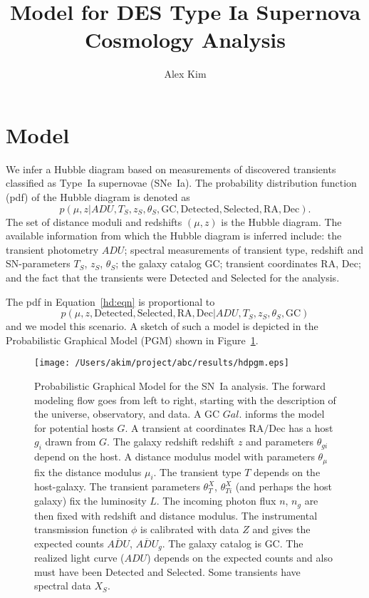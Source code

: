 \documentclass[preprint]{aastex}
\begin{document}
\title{Model for DES Type Ia Supernova Cosmology Analysis}
\author{Alex Kim}

\section{Model}
We infer a Hubble diagram based on measurements of discovered transients
classified as Type~Ia supernovae (SNe~Ia).  The probability distribution
function (pdf) of the Hubble diagram is denoted as
\begin{equation}
p({\mu},{z} |  {{ADU}}, {{T}}_S,{{z}}_S,
{{\theta}}_S,\text{GC}, \text{Detected}, {\text{Selected}},
{\text{RA}}, {\text{Dec}}).
\label{hd:eqn}
\end{equation}
The set of distance moduli
and redshifts $(\mu, z)$ is the Hubble diagram.  The available information
from which the Hubble diagram is inferred include:
the transient photometry ${ADU}$; spectral measurements of
transient
type, redshift and SN-parameters ${T}_S$, ${z}_S$, ${\theta}_S$;
the galaxy catalog ${\text{GC}}$; transient coordinates  $\text{RA}$, $\text{Dec}$;
and the fact that the transients were Detected and Selected for the analysis.

The pdf in Equation~\ref{hd:eqn} is proportional to
\begin{equation}
p({\mu},{z},   \text{Detected}, {\text{Selected}},
\text{RA}, \text{Dec} |  {{ADU}}, {{T}}_S,{{z}}_S,
{{\theta}}_S, \text{GC})
\label{hd2:eqn}
\end{equation}
and we model this scenario.  A sketch of such a model is depicted in the Probabilistic Graphical Model
(PGM)
shown in Figure~\ref{pgm:fig}.

\begin{figure}[htbp] %
   \centering
   \texttt{[image: /Users/akim/project/abc/results/hdpgm.eps]} 
   \caption{Probabilistic Graphical Model for the SN~Ia analysis.  
   The forward modeling
   flow goes from left to right, starting with the description of the universe, observatory,
   and data.
   A GC ${\mathit{Gal.}}$ informs the model for potential hosts $G$.  A transient
   at coordinates  $\text{RA/Dec}$  has a host $g_i$ drawn from $G$.
   The galaxy redshift redshift $z$ and parameters $\theta_{gi}$ depend on the host.
   A distance modulus model with parameters $\theta_\mu$ fix the distance modulus $\mu_i$.
   The transient type $T$ depends on the host-galaxy.   The transient
   parameters $\theta_T^X$, $\theta_{Ti}^X$ (and perhaps the host galaxy) fix the luminosity $L$.       The 
   incoming photon flux $n$, $n_g$  are then fixed
   with redshift and distance modulus.
   The instrumental transmission function $\phi$ is calibrated with data ${Z}$ and
   gives the expected
   counts $\overline{\mathit{ADU}}$, $\overline{\mathit{ADU}}_g$.  The galaxy catalog is GC. 
   The realized light curve (${ADU}$) depends on the expected counts and also
   must have been Detected and Selected.  Some transients have spectral data
   ${X}_S$.
   \label{pgm:fig}}
\end{figure}
\end{document}
